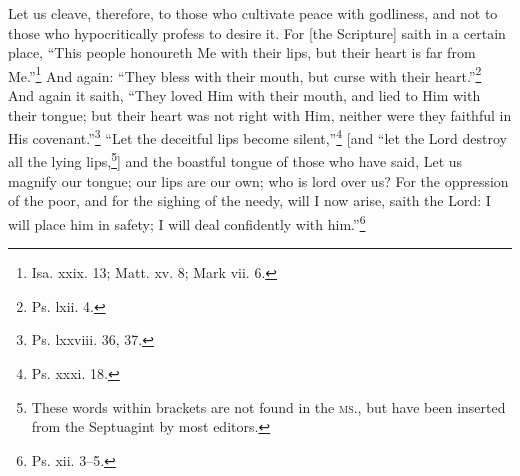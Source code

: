 
Let us cleave, therefore, to those who cultivate peace with godliness, and not to those who hypocritically profess to desire it. For [the Scripture] saith in a certain place, “This people honoureth Me with their lips, but their heart is far from Me.”\footnote{Isa. xxix. 13; Matt. xv. 8; Mark vii. 6.} And again: “They bless with their mouth, but curse with their heart.”\footnote{Ps. lxii. 4.} And again it saith, “They loved Him with their mouth, and lied to Him with their tongue; but their heart was not right with Him, neither were they faithful in His covenant.”\footnote{Ps. lxxviii. 36, 37.} “Let the deceitful lips become silent,”\footnote{Ps. xxxi. 18.} [and “let the Lord destroy all the lying lips,\footnote{These words within brackets are not found in the \textsc{ms.}, but have been inserted from the Septuagint by most editors.}] and the boastful tongue of those who have said, Let us magnify our tongue; our lips are our own; who is lord over us? For the oppression of the poor, and for the sighing of the needy, will I now arise, saith the Lord: I will place him in safety; I will deal confidently with him.”\footnote{Ps. xii. 3–5.}


